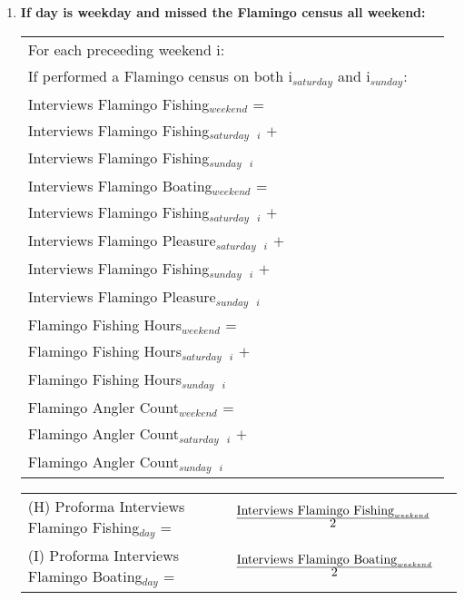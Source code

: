 \documentclass[letterpaper,12pt]{article}
\newcommand{\hspacer}{\hspace*{1cm}}
\newcommand{\fraction}[1]{\textrm{\normalsize{#1}}}
\begin{document}
\begin{enumerate}
\item
\textbf{If day is weekday and missed the Flamingo census all weekend:} \\
\begin{tabular}{l@{ }l@{ }l}
	For each preceeding weekend i: \\
\hspacer If performed a Flamingo census on both i$_{saturday}$ and i$_{sunday}$: \\
\hspacer \hspacer	Interviews Flamingo Fishing$_{weekend}$ = \\
\hspacer \hspacer \hspacer Interviews Flamingo Fishing$_{saturday}$\ $_{i}$ $+$ \\
\hspacer \hspacer \hspacer Interviews Flamingo Fishing$_{sunday}$\ $_{i}$ \\

\hspacer \hspacer	Interviews Flamingo Boating$_{weekend}$ = \\
\hspacer \hspacer \hspacer Interviews Flamingo Fishing$_{saturday}$\ $_{i}$ $+$ \\
\hspacer \hspacer \hspacer Interviews Flamingo Pleasure$_{saturday}$\ $_{i}$ $+$ \\
\hspacer \hspacer \hspacer Interviews Flamingo Fishing$_{sunday}$\ $_{i}$ $+$ \\
\hspacer \hspacer \hspacer Interviews Flamingo Pleasure$_{sunday}$\ $_{i}$ \\

\hspacer \hspacer Flamingo Fishing Hours$_{weekend}$ = \\
\hspacer \hspacer \hspacer Flamingo Fishing Hours$_{saturday}$\ $_{i}$ $+$ \\
\hspacer \hspacer \hspacer Flamingo Fishing Hours$_{sunday}$\ $_{i}$ \\

\hspacer \hspacer Flamingo Angler Count$_{weekend}$ = \\
\hspacer \hspacer \hspacer Flamingo Angler Count$_{saturday}$\ $_{i}$ $+$ \\
\hspacer \hspacer \hspacer Flamingo Angler Count$_{sunday}$\ $_{i}$ \\
\end{tabular}

\begin{tabular}{l@{ }l@{ }l}
	(H) Proforma Interviews Flamingo Fishing$_{day}$ =
		& $
\frac
	{\fraction{Interviews Flamingo Fishing}_{weekend}}
      	{\fraction{2}}
		$ \\

	(I) Proforma Interviews Flamingo Boating$_{day}$ =
		& $
\frac
	{\fraction{Interviews Flamingo Boating}_{weekend}}
      	{\fraction{2}}
		$ \\


\end{tabular}
\end{enumerate}
\end{document}
